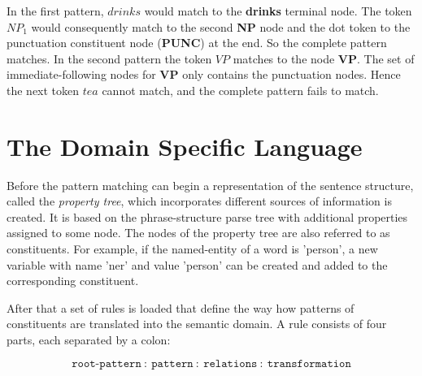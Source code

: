 \documentclass[english]{article}
\begin{document}
In the first pattern, $drinks$ would match to the \textbf{drinks} terminal node. The token $NP_1$ would consequently match to the second \textbf{NP} node and the dot token to the punctuation constituent node (\textbf{PUNC}) at the end. So the complete pattern matches. In the second pattern the token $VP$ matches to the node \textbf{VP}. The set of immediate-following nodes for \textbf{VP} only contains the punctuation nodes. Hence the next token $tea$ cannot match, and the complete pattern fails to match.


\section{The Domain Specific Language}

Before the pattern matching can begin a representation of the sentence structure, called the \textit{property tree}, which incorporates different sources of information is created. It is based on the phrase-structure parse tree with additional properties assigned to some node. The nodes of the property tree are also referred to as constituents. For example, if the named-entity of a word is 'person', a new variable with name 'ner' and value 'person' can be created and added to the corresponding constituent.

After that a set of rules is loaded that define the way how patterns of constituents are translated into the semantic domain. A rule consists of four parts, each separated by a colon: 

\[ \mathtt{root\text{-}pattern\ :\ pattern\ :\ relations\ :\ transformation} \] 
\end{document}
